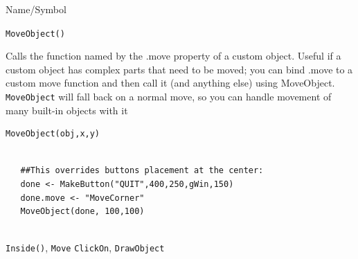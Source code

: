 \begin{desc}{Name/Symbol}
\item[Name/Symbol]	\verb+MoveObject()+

\item[Description] Calls the function named by the  .move property of a custom object.  Useful if a custom object has complex parts that need to be moved; you can bind .move to a custom move function and then call it (and anything else) using MoveObject. \texttt{MoveObject} will fall back on a normal move, so you can handle movement of many built-in objects with it

\item[Usage]
\begin{verbatim}
MoveObject(obj,x,y)	
\end{verbatim}

\item[Example]	


\begin{verbatim}
  
   ##This overrides buttons placement at the center:  
   done <- MakeButton("QUIT",400,250,gWin,150)
   done.move <- "MoveCorner"
   MoveObject(done, 100,100)
    
\end{verbatim}

\item[See Also]	
\verb+Inside()+, \verb+Move+ \verb+ClickOn+, \verb+DrawObject+

\end{desc}



\vfill
\newpage
{}
\vfill

